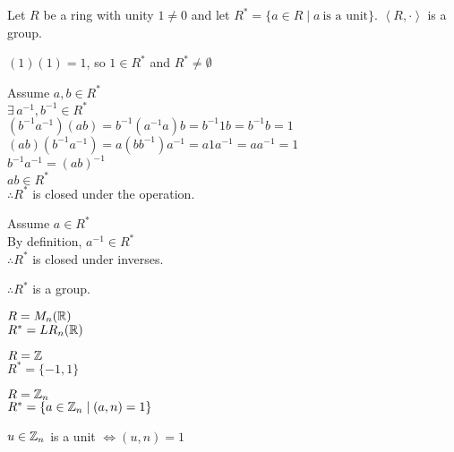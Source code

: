 \documentclass[letterpaper,12pt,fleqn]{article}
\begin{document}
\begin{theorem}
  Let $R$ be a ring with unity $1\ne0$ and let
  $R^*=\{a\in R\mid a\ \mbox{is a unit}\}$. $\left<R,\cdot\right>$ is a group.
\end{theorem}
\newpage
\begin{theproof}
  $(1)(1)=1$, so $1\in R^*$ and $R^*\ne\emptyset$

  Assume $a,b\in R^*$ \\
  $\exists\,a^{-1},b^{-1}\in R^*$ \\
  $(b^{-1}a^{-1})(ab)=b^{-1}(a^{-1}a)b=b^{-1}1b=b^{-1}b=1$ \\
  $(ab)(b^{-1}a^{-1})=a(bb^{-1})a^{-1}=a1a^{-1}=aa^{-1}=1$ \\
  $b^{-1}a^{-1}=(ab)^{-1}$ \\
  $ab\in R^*$ \\
  $\therefore R^*$ is closed under the operation.

  Assume $a\in R^*$ \\
  By definition, $a^{-1}\in R^*$ \\
  $\therefore R^*$ is closed under inverses.

  $\therefore R^*$ is a group.
\end{theproof}

\begin{example}
  $R=M_n(\mathbb{R})$ \\
  $R^*=LR_n(\mathbb{R})$

  $R=\mathbb{Z}$ \\
  $R^*=\{-1,1\}$

  $R=\mathbb{Z}_n$ \\
  $R^*=\{a\in\mathbb{Z}_n\mid(a,n)=1\}$
\end{example}

\begin{theorem}
  $u\in\mathbb{Z}_n$ is a unit $\iff (u,n)=1$
\end{theorem}
\end{document}
